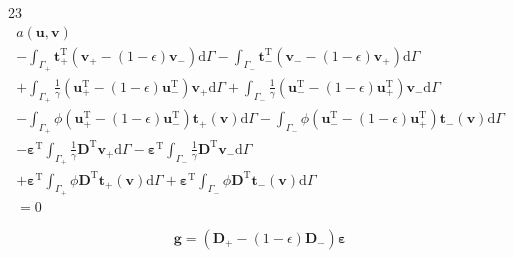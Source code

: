 \documentclass[a4paper,12pt]{article}
\begin{document}
23
\begin{equation}
\begin{split}
a(\mathbf{u},\mathbf{v})
\\-
\int_{\Gamma_+}
\mathbf{t}_+^\textrm{T}(\mathbf{v}_+ - (1-\epsilon)\mathbf{v}_-)
\textrm{d}\Gamma
-
\int_{\Gamma_-}
\mathbf{t}_-^\textrm{T}(\mathbf{v}_- - (1-\epsilon)\mathbf{v}_+)
\textrm{d}\Gamma
\\+
\int_{\Gamma_+}
\frac{1}{\gamma}
(\mathbf{u}_+^\textrm{T} - (1-\epsilon)\mathbf{u}_-^\textrm{T})
\mathbf{v}_+
\textrm{d}\Gamma
+
\int_{\Gamma_-}
\frac{1}{\gamma}
(\mathbf{u}_-^\textrm{T} - (1-\epsilon)\mathbf{u}_+^\textrm{T})
\mathbf{v}_-
\textrm{d}\Gamma
\\-
\int_{\Gamma_+}
\phi
(\mathbf{u}_+^\textrm{T} - (1-\epsilon)\mathbf{u}_-^\textrm{T})
\mathbf{t}_+(\mathbf{v})
\textrm{d}\Gamma
-
\int_{\Gamma_-}
\phi
(\mathbf{u}_-^\textrm{T} - (1-\epsilon)\mathbf{u}_+^\textrm{T})
\mathbf{t}_-(\mathbf{v})
\textrm{d}\Gamma
\\-
{\boldsymbol\varepsilon}^\textrm{T}
\int_{\Gamma_+}
\frac{1}{\gamma}
\mathbf{D}^\textrm{T}
\mathbf{v}_+
\textrm{d}\Gamma
-
{\boldsymbol\varepsilon}^\textrm{T}
\int_{\Gamma_-}
\frac{1}{\gamma}
\mathbf{D}^\textrm{T}
\mathbf{v}_-
\textrm{d}\Gamma
\\+
{\boldsymbol\varepsilon}^\textrm{T}
\int_{\Gamma_+}
\phi\mathbf{D}^\textrm{T}
\mathbf{t}_+(\mathbf{v})
\textrm{d}\Gamma
+
{\boldsymbol\varepsilon}^\textrm{T}
\int_{\Gamma_-}
\phi\mathbf{D}^\textrm{T}
\mathbf{t}_-(\mathbf{v})
\textrm{d}\Gamma
\\=
0
\end{split}
\end{equation}


\begin{equation}
\mathbf{g}
=
(\mathbf{D}_{+}-(1-\epsilon)\mathbf{D}_{-}){\boldsymbol\varepsilon}
\end{equation}
\end{document}
